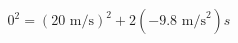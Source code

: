 \documentclass[preview]{standalone}
\begin{document}
\begin{align*}
0^2 = (20 \text{ m/s})^2 + 2(-9.8 \text{ m/s}^2)s
\end{align*}
\end{document}
